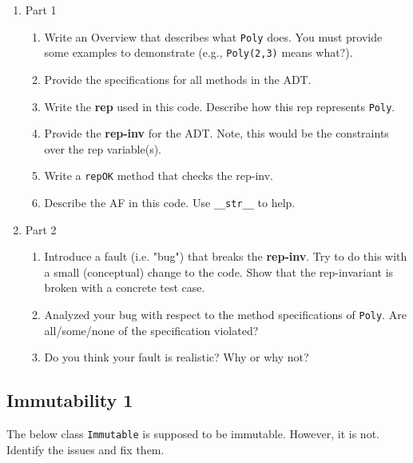\documentclass[oneside,11pt,dvipsnames]{book}
\newcommand{\sol}[1]{\iftoggle{usesol}{\textbf{Sol:} #1}{}}
\newcommand{\code}[1]{\texttt{#1}}
\begin{document}
\begin{enumerate}
        \item Part 1
\begin{enumerate}
\item Write an Overview that describes what \code{Poly} does. You must provide some examples to demonstrate (e.g., \code{Poly(2,3)} means what?).
\item Provide the specifications for all methods in the ADT. 
\item Write the \textbf{rep} used in this code.  Describe how this rep represents \code{Poly}.
\item Provide the \textbf{rep-inv} for the ADT. Note, this would be the constraints over the rep variable(s).
\item Write a \code{repOK} method that checks the rep-inv.
\item Describe the AF in this code. Use \code{\_\_str\_\_} to help.
\end{enumerate}

        \item Part 2
\begin{enumerate}
        \item Introduce a fault (i.e. "bug") that breaks the \textbf{rep-inv}. Try to do this with a small (conceptual) change to the code. Show that the rep-invariant is broken with a concrete test case.
        \item Analyzed your bug with respect to the method specifications of \code{Poly}. Are all/some/none of the specification violated?
        \item Do you think your fault is realistic? Why or why not?
\end{enumerate}
        
\end{enumerate}


\subsection{Immutability 1}\label{sec:immutability1}

The below class \code{Immutable} is supposed to be immutable. However, it is not. Identify the issues and fix them.  

\end{document}
